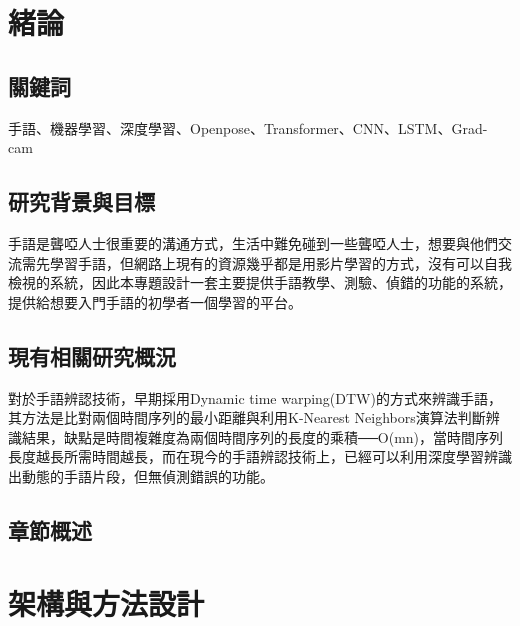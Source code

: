 \documentclass[12pt,a4paper]{report}
\begin{document}
\begin{CJK*}{UTF8}{bkai}


    \newpage


    \chapter{緒論}

    \section{關鍵詞}
    \par
    手語、機器學習、深度學習、Openpose、Transformer、CNN、LSTM、Grad-cam

    \section{研究背景與目標}
    \par
    手語是聾啞人士很重要的溝通方式，生活中難免碰到一些聾啞人士，想要與他們交流需先學習手語，但網路上現有的資源幾乎都是用影片學習的方式，沒有可以自我檢視的系統，因此本專題設計一套主要提供手語教學、測驗、偵錯的功能的系統，提供給想要入門手語的初學者一個學習的平台。

    \section{現有相關研究概況}
    \par
    對於手語辨認技術，早期採用Dynamic time warping(DTW)的方式來辨識手語，其方法是比對兩個時間序列的最小距離與利用K-Nearest Neighbors演算法判斷辨識結果，缺點是時間複雜度為兩個時間序列的長度的乘積──O(mn)，當時間序列長度越長所需時間越長，而在現今的手語辨認技術上，已經可以利用深度學習辨識出動態的手語片段，但無偵測錯誤的功能。
    \par


    \section{章節概述}
    \par

    \chapter{架構與方法設計}

\end{CJK*}
\end{document}
